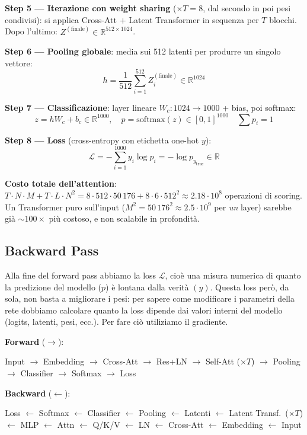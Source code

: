 \documentclass[
  11pt,
]{article}
\begin{document}
\begin{notabox}[title={\textbf{Esempio end-to-end: forward pass su un'immagine ImageNet}}]
\textbf{Step 5 --- Iterazione con weight sharing} ($\times T = 8$, dal secondo in poi pesi condivisi): si applica Cross-Att $+$ Latent Transformer in sequenza per $T$ blocchi. Dopo l'ultimo: $Z^{(\text{finale})} \in \mathbb{R}^{512 \times 1024}$.

\textbf{Step 6 --- Pooling globale}: media sui 512 latenti per produrre un singolo vettore:
\[ h = \frac{1}{512}\sum_{i=1}^{512} Z^{(\text{finale})}_i \in \mathbb{R}^{1024} \]

\textbf{Step 7 --- Classificazione}: layer lineare $W_c: 1024 \to 1000$ + bias, poi softmax:
\[ z = h W_c + b_c \in \mathbb{R}^{1000}, \quad p = \mathrm{softmax}(z) \in [0,1]^{1000} \quad \sum p_i = 1 \]

\textbf{Step 8 --- Loss} (cross-entropy con etichetta one-hot $y$):
\[ \mathcal{L} = -\sum_{i=1}^{1000} y_i \log p_i = -\log p_{y_{\text{true}}} \in \mathbb{R} \]

\textbf{Costo totale dell'attention}: $T \cdot N \cdot M + T \cdot L \cdot N^2 = 8 \cdot 512 \cdot 50\,176 + 8 \cdot 6 \cdot 512^2 \approx 2.18 \cdot 10^8$ operazioni di scoring. Un Transformer puro sull'input ($M^2 = 50\,176^2 \approx 2.5 \cdot 10^9$ per \emph{un} layer) sarebbe già $\sim 100\times$ più costoso, e non scalabile in profondità.
\end{notabox}

\subsection{Backward Pass}
\label{sec:backward}

Alla fine del forward pass abbiamo la loss \(\mathcal{L}\), cioè una
misura numerica di quanto la predizione del modello (\(p\)) è lontana
dalla verità \((y)\). Questa loss però, da sola, non basta a migliorare
i pesi: per sapere come modificare i parametri della rete dobbiamo
calcolare quanto la loss dipende dai valori interni del modello (logits,
latenti, pesi, ecc.). Per fare ciò utiliziamo il gradiente.

\begin{tcolorbox}[title={\textbf{Forward \& Backward Pass --- Overview}},
  colback=white, colframe=seccolor!70, boxrule=0.6pt, arc=4pt,
  left=6pt, right=6pt, top=6pt, bottom=6pt,
  fonttitle=\small, coltitle=white, colbacktitle=seccolor!70, breakable]
{\small\textbf{Forward} ($\longrightarrow$):\par
\smallskip
Input $\to$ Embedding $\to$ Cross-Att $\to$ Res+LN $\to$ Self-Att ($\times T$) $\to$ Pooling $\to$ Classifier $\to$ Softmax $\to$ Loss}
\tcblower
{\small\textbf{Backward} ($\longleftarrow$):\par
\smallskip
Loss $\leftarrow$ Softmax $\leftarrow$ Classifier $\leftarrow$ Pooling $\leftarrow$ Latenti $\leftarrow$ Latent Transf.\ ($\times T$) $\leftarrow$ MLP $\leftarrow$ Attn $\leftarrow$ Q/K/V $\leftarrow$ LN $\leftarrow$ Cross-Att $\leftarrow$ Embedding $\leftarrow$ Input}
\end{tcolorbox}
\end{document}

